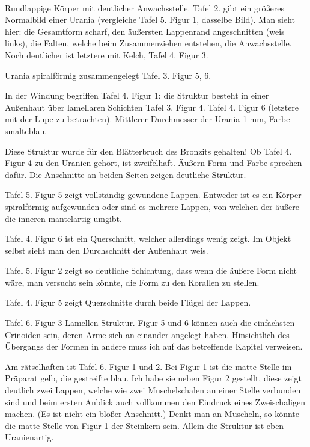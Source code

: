 \documentclass[a4paper, 12pt, oneside]{article}
\begin{document}
\paragraph{}
Rundlappige Körper mit deutlicher Anwachsstelle. Tafel 2. gibt ein größeres Normalbild einer Urania (vergleiche Tafel 5. Figur 1, dasselbe Bild). Man sieht hier: die Gesamtform scharf, den äußersten Lappenrand angeschnitten (weis links), die Falten, welche beim Zusammenziehen entstehen, die Anwachsstelle. Noch deutlicher ist letztere mit Kelch, Tafel 4. Figur 3.

Urania spiralförmig zusammengelegt Tafel 3. Figur 5, 6.

In der Windung begriffen Tafel 4. Figur 1: die Struktur besteht in einer Außenhaut über lamellaren Schichten Tafel 3. Figur 4. Tafel 4. Figur 6 (letztere mit der Lupe zu betrachten). Mittlerer Durchmesser der Urania 1 mm, Farbe smalteblau.

Diese Struktur wurde für den Blätterbruch des Bronzits gehalten! Ob Tafel 4. Figur 4 zu den Uranien gehört, ist zweifelhaft. Äußern Form und Farbe sprechen dafür. Die Anschnitte an beiden Seiten zeigen deutliche Struktur.

Tafel 5. Figur 5 zeigt vollständig gewundene Lappen. Entweder ist es ein Körper spiralförmig aufgewunden oder sind es mehrere Lappen, von welchen der äußere die inneren mantelartig umgibt.

Tafel 4. Figur 6 ist ein Querschnitt, welcher allerdings wenig zeigt. Im Objekt selbst sieht man den Durchschnitt der Außenhaut weis.

Tafel 5. Figur 2 zeigt so deutliche Schichtung, dass wenn die äußere Form nicht wäre, man versucht sein könnte, die Form zu den Korallen zu stellen.

Tafel 4. Figur 5 zeigt Querschnitte durch beide Flügel der Lappen.

Tafel 6. Figur 3 Lamellen-Struktur. Figur 5 und 6 können auch die einfachsten Crinoiden sein, deren Arme sich an einander angelegt haben. Hinsichtlich des Übergangs der Formen in andere muss ich auf das betreffende Kapitel verweisen.

Am rätselhaften ist Tafel 6. Figur 1 und 2. Bei Figur 1 ist die matte Stelle im Präparat gelb, die gestreifte blau. Ich habe sie neben Figur 2 gestellt, diese zeigt deutlich zwei Lappen, welche wie zwei Muschelschalen an einer Stelle verbunden sind und beim ersten Anblick auch vollkommen den Eindruck eines Zweischaligen machen. (Es ist nicht ein bloßer Anschnitt.) Denkt man an Muscheln, so könnte die matte Stelle von Figur 1 der Steinkern sein. Allein die Struktur ist eben Uranienartig.
\end{document}
